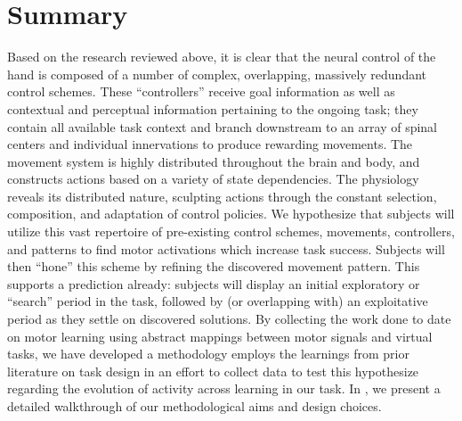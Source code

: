 \documentclass[../main.tex]{subfiles}
\begin{document}












\section{Summary}

Based on the research reviewed above, it is clear that the neural control of the hand is composed of a number of complex, overlapping, massively redundant control schemes. These ``controllers'' receive goal information as well as contextual and perceptual information pertaining to the ongoing task; they contain all available task context and branch downstream to an array of spinal centers and individual innervations to produce rewarding movements. The movement system is highly distributed throughout the brain and body, and constructs actions based on a variety of state dependencies\cite{sejnowskiPerspectivesCognitiveNeuroscience1988}. The physiology reveals its distributed nature, sculpting actions through the constant selection, composition, and adaptation of control policies. We hypothesize that subjects will utilize this vast repertoire of pre-existing control schemes, movements, controllers, and patterns to find motor activations which increase task success. Subjects will then ``hone'' this scheme by refining the discovered movement pattern. This supports a prediction already: subjects will display an initial exploratory or ``search'' period in the task, followed by (or overlapping with) an exploitative period as they settle on discovered solutions. By collecting the work done to date on motor learning using abstract mappings between motor signals and virtual tasks, we have developed a methodology employs the learnings from prior literature on task design in an effort to collect data to test this hypothesize regarding the evolution of activity across learning in our task. In , we present a detailed walkthrough of our methodological aims and design choices.
\end{document}
